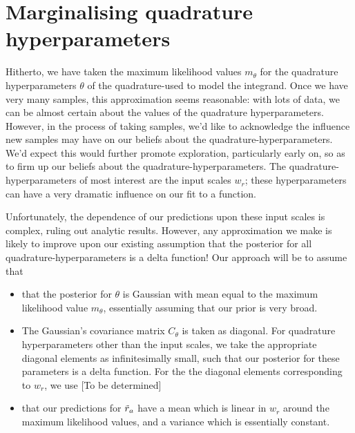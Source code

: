\documentclass{article}
\begin{document}
\section{Marginalising quadrature hyperparameters}

Hitherto, we have taken the maximum likelihood values $m_\theta$ for the quadrature hyperparameters $\theta$ of the quadrature-\gpb used to model the integrand. Once we have very many samples, this approximation seems reasonable: with lots of data, we can be almost certain about the values of the quadrature hyperparameters. However, in the process of taking samples, we'd like to acknowledge the influence new samples may have on our beliefs about the quadrature-hyperparameters. We'd expect this would further promote exploration, particularly early on, so as to firm up our beliefs about the quadrature-hyperparameters. The quadrature-hyperparameters of most interest are the input scales $w_r$; these hyperparameters can have a very dramatic influence on our fit to a function.

Unfortunately, the dependence of our predictions upon these input scales is complex, ruling out analytic results. However, any approximation we make is likely to improve upon our existing assumption that the posterior for all quadrature-hyperparameters is a delta function! Our approach will be to assume that
\begin{itemize}
 \item that the posterior for $\theta$ is Gaussian with mean equal to the maximum likelihood value $m_\theta$, essentially assuming that our prior is very broad. 
\item The Gaussian's covariance matrix $C_\theta$ is taken as diagonal. For quadrature hyperparameters other than the input scales, we take the appropriate diagonal elements as infinitesimally small, such that our posterior for these parameters is a delta function. For the the diagonal elements corresponding to $w_r$, we use [To be determined]
\item that our predictions for $\tr_a$ have a mean which is linear in $w_r$ around the maximum likelihood values, and a variance which is essentially constant.  
\end{itemize}
 
\end{document}

